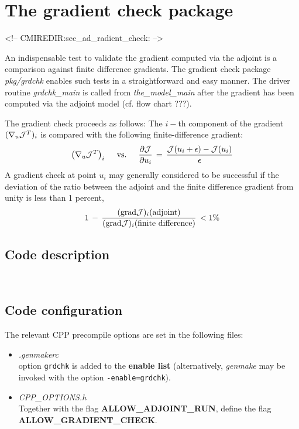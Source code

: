 
\section{The gradient check package}
\label{sect:ad_gradient_check}
\label{sec_ad_radient_check}
\begin{rawhtml}
<!-- CMIREDIR:sec_ad_radient_check: -->
\end{rawhtml}

An indispensable test to validate the gradient computed
via the adjoint is a comparison against finite difference
gradients.
The gradient check package {\it pkg/grdchk} enables such tests
in a straightforward and easy manner.
The driver routine {\it grdchk\_main} is called from
{\it the\_model\_main} after the gradient has been computed
via the adjoint model (cf. flow chart ???).

The gradient check proceeds as follows:
The $i-$th component of the gradient $ (\nabla _{u}{\cal J}^T)_i $
is compared with  the following finite-difference gradient:
\[
\left(\nabla _{u}{\cal J}^T  \right)_i \quad \text{ vs. } \quad
\frac{\partial {\cal J}}{\partial u_i} \, = \,
\frac{ {\cal J}(u_i + \epsilon) - {\cal J}(u_i)}{\epsilon}
\]
A gradient check at point $u_i$ may generally considered to be successful
if the deviation of the ratio between the adjoint and the 
finite difference gradient from unity is less than 1 percent,
\[
1 \, - \, 
\frac{({\rm grad}{\cal J})_i (\text{adjoint})}
{({\rm grad}{\cal J})_i (\text{finite difference})} \, < 1 \%
\]

\subsection{Code description}
~

\subsection{Code configuration}
%
The relevant CPP precompile options are set
in the following files:
%
\begin{itemize}
%
\item {\it .genmakerc} \\
option {\tt grdchk} is added to the {\bf enable list}
(alternatively, {\it genmake} may be invoked with the
option {\tt -enable=grdchk}).
%
\item {\it CPP\_OPTIONS.h} \\
Together with the flag 
{\bf ALLOW\_ADJOINT\_RUN}, define the flag
{\bf ALLOW\_GRADIENT\_CHECK}.
%
\end{itemize}

